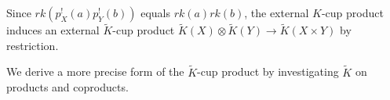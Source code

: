 Since $rk(p_X^!(a)p_Y^!(b))$ equals $rk(a)rk(b)$, the external $K$-cup product induces an external $\tilde{K}$-cup product $\tilde{K}(X) \otimes \tilde{K}(Y) \rightarrow \tilde{K}(X \times Y)$ by restriction.

We derive a more precise form of the $\tilde{K}$-cup product by investigating $\tilde{K}$ on products and coproducts.
